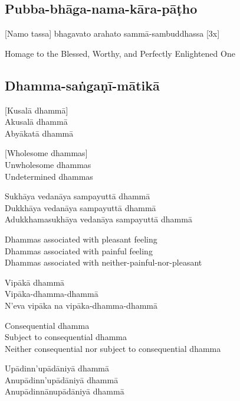 \subsection{Pubba-bhāga-nama-kāra-pāṭho}
\label{pubba-bhaga-nama-kara-patho}
[Namo tassa] bhagavato arahato sammā-sambuddhassa \hfill{[3x]}

\begin{english}
  Homage to the Blessed, Worthy, and Perfectly Enlightened One
\end{english}

\subsection{Dhamma-saṅgaṇī-mātikā}
\label{dhamma-sangani-matika}
[Kusalā dhammā]\\
Akusalā dhammā\\
Abyākatā dhammā

\begin{english}
  [Wholesome dhammas]\\
  Unwholesome dhammas\\
  Undetermined dhammas
\end{english}

Sukhāya vedanāya sampayuttā dhammā\\
Dukkhāya vedanāya sampayuttā dhammā\\
Adukkhamasukhāya vedanāya sampayuttā dhammā

\begin{english}
  Dhammas associated with pleasant feeling\\
  Dhammas associated with painful feeling\\
  Dhammas associated with neither-painful-nor-pleasant
\end{english}

Vipākā dhammā\\
Vipāka-dhamma-dhammā\\
N’eva vipāka na vipāka-dhamma-dhammā

\begin{english}
  Consequential dhamma\\
  Subject to consequential dhamma\\
  Neither consequential nor subject to consequential dhamma
\end{english}

Upādinn’upādāniyā dhammā\\
Anupādinn’upādāniyā dhammā\\
Anupādinnānupādāniyā dhammā

